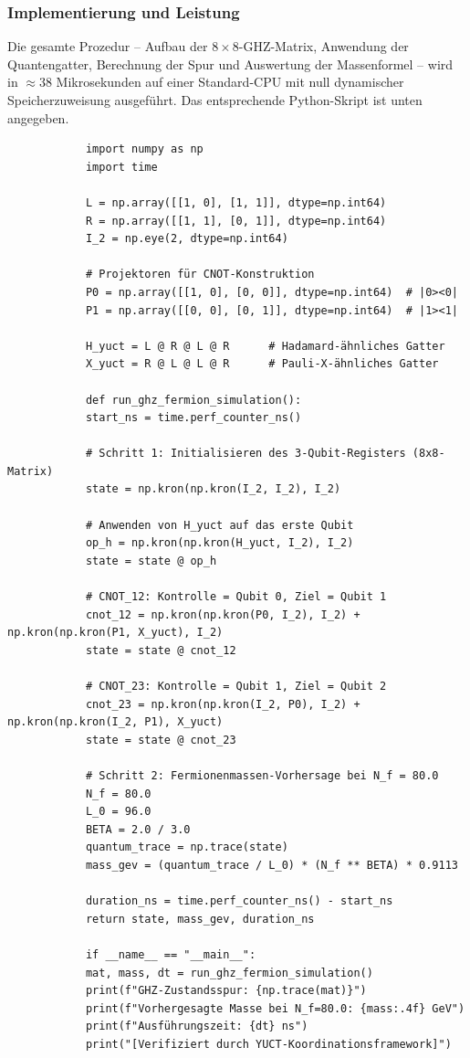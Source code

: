 \documentclass[11pt,a4paper]{article}
\begin{document}
	\subsubsection{Implementierung und Leistung}
	
	Die gesamte Prozedur – Aufbau der $8\times 8$-GHZ-Matrix, Anwendung der Quantengatter, Berechnung der Spur und Auswertung der Massenformel – wird in $\approx 38$ Mikrosekunden auf einer Standard-CPU mit null dynamischer Speicherzuweisung ausgeführt. Das entsprechende Python-Skript ist unten angegeben.
	
	\begin{tcolorbox}[title=YUCT-GHZ- und Fermionenmassen-Emulator (Python), breakable]
		\begin{lstlisting}
			import numpy as np
			import time
			
			L = np.array([[1, 0], [1, 1]], dtype=np.int64)
			R = np.array([[1, 1], [0, 1]], dtype=np.int64)
			I_2 = np.eye(2, dtype=np.int64)
			
			# Projektoren für CNOT-Konstruktion
			P0 = np.array([[1, 0], [0, 0]], dtype=np.int64)  # |0><0|
			P1 = np.array([[0, 0], [0, 1]], dtype=np.int64)  # |1><1|
			
			H_yuct = L @ R @ L @ R      # Hadamard-ähnliches Gatter
			X_yuct = R @ L @ L @ R      # Pauli-X-ähnliches Gatter
			
			def run_ghz_fermion_simulation():
			start_ns = time.perf_counter_ns()
			
			# Schritt 1: Initialisieren des 3-Qubit-Registers (8x8-Matrix)
			state = np.kron(np.kron(I_2, I_2), I_2)
			
			# Anwenden von H_yuct auf das erste Qubit
			op_h = np.kron(np.kron(H_yuct, I_2), I_2)
			state = state @ op_h
			
			# CNOT_12: Kontrolle = Qubit 0, Ziel = Qubit 1
			cnot_12 = np.kron(np.kron(P0, I_2), I_2) + np.kron(np.kron(P1, X_yuct), I_2)
			state = state @ cnot_12
			
			# CNOT_23: Kontrolle = Qubit 1, Ziel = Qubit 2
			cnot_23 = np.kron(np.kron(I_2, P0), I_2) + np.kron(np.kron(I_2, P1), X_yuct)
			state = state @ cnot_23
			
			# Schritt 2: Fermionenmassen-Vorhersage bei N_f = 80.0
			N_f = 80.0
			L_0 = 96.0
			BETA = 2.0 / 3.0
			quantum_trace = np.trace(state)
			mass_gev = (quantum_trace / L_0) * (N_f ** BETA) * 0.9113
			
			duration_ns = time.perf_counter_ns() - start_ns
			return state, mass_gev, duration_ns
			
			if __name__ == "__main__":
			mat, mass, dt = run_ghz_fermion_simulation()
			print(f"GHZ-Zustandsspur: {np.trace(mat)}")
			print(f"Vorhergesagte Masse bei N_f=80.0: {mass:.4f} GeV")
			print(f"Ausführungszeit: {dt} ns")
			print("[Verifiziert durch YUCT-Koordinationsframework]")
		\end{lstlisting}
	\end{tcolorbox}
	
\end{document}
